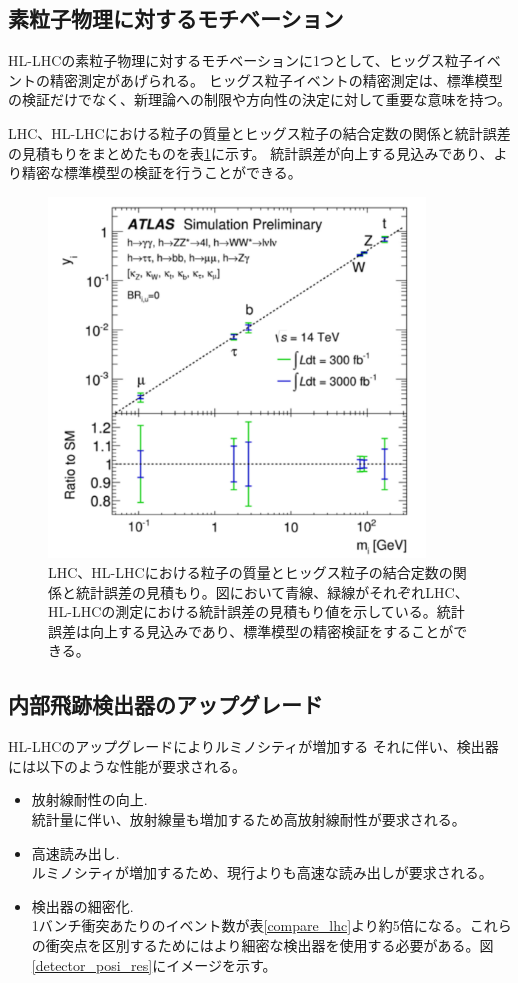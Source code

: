 \subsection{素粒子物理に対するモチベーション}
HL-LHCの素粒子物理に対するモチベーションに1つとして、ヒッグス粒子イベントの精密測定があげられる。
ヒッグス粒子イベントの精密測定は、標準模型の検証だけでなく、新理論への制限や方向性の決定に対して重要な意味を持つ。

LHC、HL-LHCにおける粒子の質量とヒッグス粒子の結合定数の関係と統計誤差の見積もりをまとめたものを表\ref{higgs_uncertainty}に示す。
統計誤差が向上する見込みであり、より精密な標準模型の検証を行うことができる。

\begin{figure}[bpt]\centering
\includegraphics[width=10cm]{./higgs_uncertainty.pdf}
\caption[LHC、HL-LHCにおける粒子の質量とヒッグス粒子の結合定数の関係と統計誤差の見積もり]{LHC、HL-LHCにおける粒子の質量とヒッグス粒子の結合定数の関係と統計誤差の見積もり\cite{1-12}。図において青線、緑線がそれぞれLHC、HL-LHCの測定における統計誤差の見積もり値を示している。統計誤差は向上する見込みであり、標準模型の精密検証をすることができる。}
\label{higgs_uncertainty}
\end{figure}


\subsection{内部飛跡検出器のアップグレード}
HL-LHCのアップグレードによりルミノシティが増加する
それに伴い、検出器には以下のような性能が要求される。

\begin{itemize}
  \item 放射線耐性の向上.\\
  統計量に伴い、放射線量も増加するため高放射線耐性が要求される。
  \item 高速読み出し.\\
  ルミノシティが増加するため、現行よりも高速な読み出しが要求される。
  \item 検出器の細密化.\\
  1バンチ衝突あたりのイベント数が表\ref{compare_lhc}より約5倍になる。これらの衝突点を区別するためにはより細密な検出器を使用する必要がある。図\ref{detector_posi_res}にイメージを示す。
\end{itemize}

